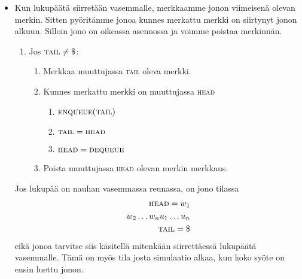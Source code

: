 \documentclass[finnish,11pt]{article}
\begin{document}
\begin{enumerate}
\begin{itemize}
\item
  Kun lukupäätä siirretään vasemmalle, merkkaamme jonon viimeisenä olevan
  merkin. Sitten pyö\-ri\-täm\-me jonoa kunnes merkattu merkki on siirtynyt
  jonon alkuun. Silloin jono on oikeassa asennossa ja voimme poistaa
  merkinnän.
%
  \begin{enumerate}[label=\arabic*.]
  \item
    Jos $\textsc{tail} \neq \$$:
    \begin{enumerate}[label=\arabic*.]
    \item
      Merkkaa muuttujassa \textsc{tail} oleva merkki.
    \item
      Kunnes merkattu merkki on muuttujassa \textsc{head}
      \begin{enumerate}[label=\arabic*.]
      \item
        $\textsc{enqueue}(\textsc{tail})$
      \item
        $\textsc{tail} = \textsc{head}$
      \item
        $\textsc{head} = \textsc{dequeue}$
      \end{enumerate}
    \item
      Poista muuttujassa \textsc{head} olevan merkin merkkaus.
    \end{enumerate}
  \end{enumerate}

  Jos lukupää on nauhan vasemmassa reunassa, on jono tilassa
%
  \begin{align*}
    \textsc{head} = w_1 \\
    w_2 \dots w_nu_1 \dots u_n \\
    \textsc{tail} = \$
  \end{align*}
%
  eikä jonoa tarvitse siis käsitellä mitenkään siirrettäessä lukupäätä
  vasemmalle. Tämä on myös tila josta simulaatio alkaa, kun koko syöte on
  ensin luettu jonon.
\end{itemize}


\end{enumerate}
\end{document}
